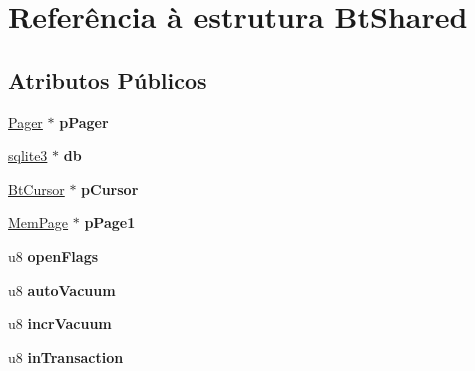 \hypertarget{struct_bt_shared}{\section{Referência à estrutura Bt\-Shared}
\label{struct_bt_shared}
}
\subsection*{Atributos Públicos}
\begin{DoxyCompactItemize}
\item 
\hypertarget{struct_bt_shared_ab79703fc47a16446274457588d7eb989}{\hyperlink{struct_pager}{Pager} $\ast$ {\bfseries p\-Pager}}\label{struct_bt_shared_ab79703fc47a16446274457588d7eb989}

\item 
\hypertarget{struct_bt_shared_a93dafa672793f6117a336d5987951c8e}{\hyperlink{structsqlite3}{sqlite3} $\ast$ {\bfseries db}}\label{struct_bt_shared_a93dafa672793f6117a336d5987951c8e}

\item 
\hypertarget{struct_bt_shared_a8f8b52dee390e5606e8e2a8511530de7}{\hyperlink{struct_bt_cursor}{Bt\-Cursor} $\ast$ {\bfseries p\-Cursor}}\label{struct_bt_shared_a8f8b52dee390e5606e8e2a8511530de7}

\item 
\hypertarget{struct_bt_shared_a296dffd1c698ec175fee109718f32d5d}{\hyperlink{struct_mem_page}{Mem\-Page} $\ast$ {\bfseries p\-Page1}}\label{struct_bt_shared_a296dffd1c698ec175fee109718f32d5d}

\item 
\hypertarget{struct_bt_shared_a8fbc250e23d7c417ccfec8cceb08329d}{u8 {\bfseries open\-Flags}}\label{struct_bt_shared_a8fbc250e23d7c417ccfec8cceb08329d}

\item 
\hypertarget{struct_bt_shared_a770c4f6244d4350f27029cb909902a61}{u8 {\bfseries auto\-Vacuum}}\label{struct_bt_shared_a770c4f6244d4350f27029cb909902a61}

\item 
\hypertarget{struct_bt_shared_a8d8ba06335a63d8a36294a0f1ae8377a}{u8 {\bfseries incr\-Vacuum}}\label{struct_bt_shared_a8d8ba06335a63d8a36294a0f1ae8377a}

\item 
\hypertarget{struct_bt_shared_aeaa6c0f33b83434ecee4bd8c4c8df48e}{u8 {\bfseries in\-Transaction}}\label{struct_bt_shared_aeaa6c0f33b83434ecee4bd8c4c8df48e}


\end{DoxyCompactItemize}
